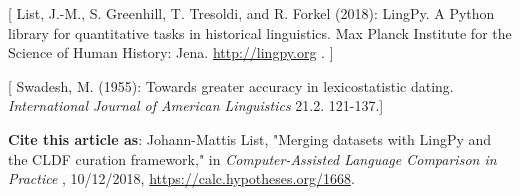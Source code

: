 \documentclass[
  english,
  a4paper,
  oneside,tablecaptionabove
]{scrbook}
\begin{document}
{[} List, J.-M., S. Greenhill, T. Tresoldi, and R. Forkel (2018):
LingPy. A Python library for quantitative tasks in historical
linguistics. Max Planck Institute for the Science of Human History:
Jena. \href{//lingpy.org”}{http://lingpy.org} . {]}

{[} Swadesh, M. (1955): Towards greater accuracy in lexicostatistic
dating. \emph{International Journal of American Linguistics} 21.2.
121-137.{]}

\textbf{Cite this article as}: Johann-Mattis List, "Merging datasets
with LingPy and the CLDF curation framework," in \emph{Computer-Assisted
Language Comparison in Practice} , 10/12/2018,
\url{https://calc.hypotheses.org/1668}.
\end{document}
